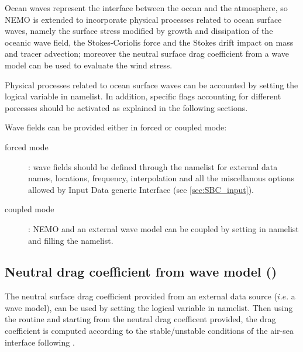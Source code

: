 \documentclass[../tex_main/NEMO_manual]{subfiles}
\begin{document}
Ocean waves represent the interface between the ocean and the atmosphere, so NEMO is extended to incorporate 
physical processes related to ocean surface waves, namely the surface stress modified by growth and 
dissipation of the oceanic wave field, the Stokes-Coriolis force and the Stokes drift impact on mass and 
tracer advection; moreover the neutral surface drag coefficient from a wave model can be used to evaluate 
the wind stress.

Physical processes related to ocean surface waves can be accounted by setting the logical variable 
 in  namelist. In addition, specific flags accounting for 
different porcesses should be activated as explained in the following sections.

Wave fields can be provided either in forced or coupled mode:
\begin{description}
\item[forced mode]: wave fields should be defined through the  namelist 
for external data names, locations, frequency, interpolation and all the miscellanous options allowed by 
Input Data generic Interface (see \autoref{sec:SBC_input}). 
\item[coupled mode]: NEMO and an external wave model can be coupled by setting   
in  namelist and filling the  namelist.
\end{description}


\subsection{Neutral drag coefficient from wave model (\protect{})}
\label{subsec:SBC_wave_cdgw}

The neutral surface drag coefficient provided from an external data source ($i.e.$ a wave model), 
can be used by setting the logical variable   in  namelist. 
Then using the routine  and starting from the neutral drag coefficent provided, 
the drag coefficient is computed according to the stable/unstable conditions of the 
air-sea interface following \citet{Large_Yeager_Rep04}. 


\end{document}
